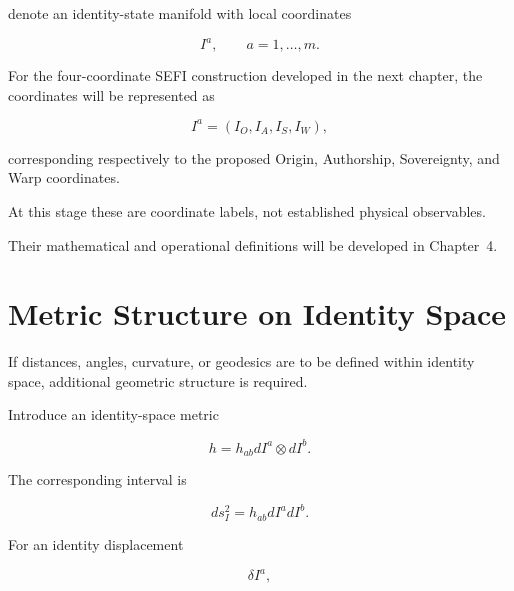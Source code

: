 \documentclass[12pt,oneside]{book}
\begin{document}
denote an identity-state manifold with local coordinates

\begin{equation}
    I^a,
    \qquad
    a=1,\ldots,m.
    \label{eq:identity-coordinates-general}
\end{equation}

For the four-coordinate SEFI construction developed in the next
chapter, the coordinates will be represented as

\begin{equation}
    I^a
    =
    \left(
        I_O,
        I_A,
        I_S,
        I_W
    \right),
    \label{eq:four-identity-coordinates}
\end{equation}

corresponding respectively to the proposed Origin, Authorship,
Sovereignty, and Warp coordinates.

At this stage these are coordinate labels, not established
physical observables.

Their mathematical and operational definitions will be
developed in Chapter~4.


\section{Metric Structure on Identity Space}
\label{sec:identity-metric}

If distances, angles, curvature, or geodesics are to be defined
within identity space, additional geometric structure is
required.

Introduce an identity-space metric

\begin{equation}
    h
    =
    h_{ab}
    dI^a
    \otimes
    dI^b.
    \label{eq:identity-metric}
\end{equation}

The corresponding interval is

\begin{equation}
    ds_I^2
    =
    h_{ab}
    dI^a dI^b.
    \label{eq:identity-line-element}
\end{equation}

For an identity displacement

\begin{equation}
    \delta I^a,
\end{equation}
\end{document}
